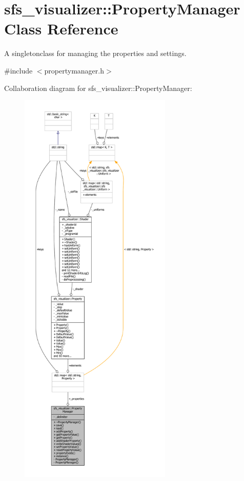 \section{sfs\-\_\-visualizer\-:\-:Property\-Manager Class Reference}
\label{classsfs__visualizer_1_1PropertyManager}


A singletonclass for managing the properties and settings.  




{\ttfamily \#include $<$propertymanager.\-h$>$}



Collaboration diagram for sfs\-\_\-visualizer\-:\-:Property\-Manager\-:\nopagebreak
\begin{figure}[H]
\begin{center}
\leavevmode
\includegraphics[height=550pt]{db/dd4/classsfs__visualizer_1_1PropertyManager__coll__graph}
\end{center}
\end{figure}
